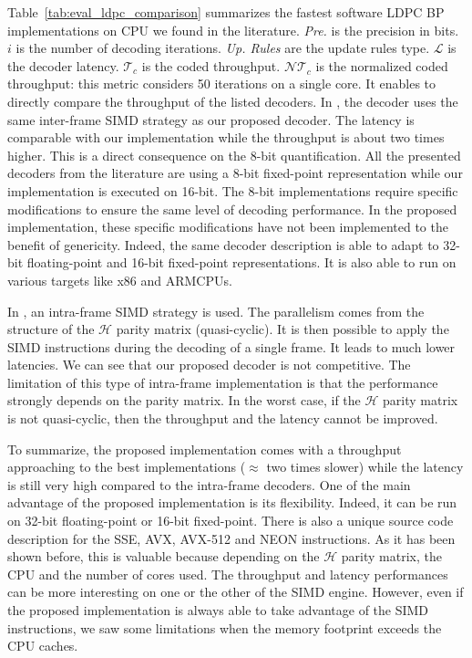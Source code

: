 Table~\ref{tab:eval_ldpc_comparison} summarizes the fastest software LDPC BP
implementations on CPU we found in the literature. \emph{Pre.} is the precision
in bits. $i$ is the number of decoding iterations. \emph{Up. Rules} are the
update rules type. $\mathcal{L}$ is the decoder latency. $\mathcal{T}_c$ is the
coded throughput. $\mathcal{NT}_c$ is the normalized coded throughput: this
metric considers 50 iterations on a single core. It enables to directly compare
the throughput of the listed decoders. In \cite{LeGal2016}, the decoder uses
the same inter-frame SIMD strategy as our proposed decoder. The latency is
comparable with our implementation while the throughput is about two times
higher. This is a direct consequence on the 8-bit quantification. All the
presented decoders from the literature are using a 8-bit fixed-point
representation while our implementation is executed on 16-bit. The 8-bit
implementations require specific modifications to ensure the same level of
decoding performance. In the proposed implementation, these specific
modifications have not been implemented to the benefit of genericity. Indeed,
the same decoder description is able to adapt to 32-bit floating-point and
16-bit fixed-point representations. It is also able to run on various targets
like x86 and ARM\R CPUs.

In \cite{LeGal2017,Xu2019}, an intra-frame SIMD strategy is used. The
parallelism comes from the structure of the $\mathcal{H}$ parity matrix
(quasi-cyclic). It is then possible to apply the SIMD instructions during the
decoding of a single frame. It leads to much lower latencies. We can see that
our proposed decoder is not competitive. The limitation of this type of
intra-frame implementation is that the performance strongly depends on the
parity matrix. In the worst case, if the $\mathcal{H}$ parity matrix is not
quasi-cyclic, then the throughput and the latency cannot be improved.

To summarize, the proposed implementation comes with a throughput approaching to
the best implementations ($\approx$ two times slower) while the latency is still
very high compared to the intra-frame decoders. One of the main advantage of the
proposed implementation is its flexibility. Indeed, it can be run on 32-bit
floating-point or 16-bit fixed-point. There is also a unique source code
description for the SSE, AVX, AVX-512 and NEON instructions. As it has been
shown before, this is valuable because depending on the $\mathcal{H}$ parity
matrix, the CPU and the number of cores used. The throughput and latency
performances can be more interesting on one or the other of the SIMD engine.
However, even if the proposed implementation is always able to take advantage of
the SIMD instructions, we saw some limitations when the memory footprint exceeds
the CPU caches.


